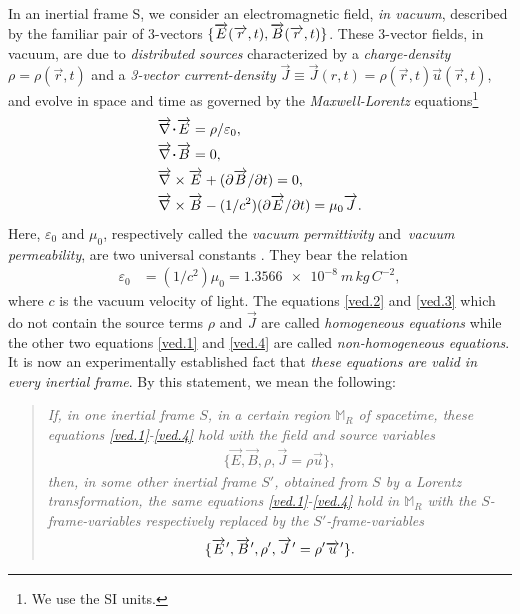 In an inertial frame S, we consider an electromagnetic  
field, \textsl{in vacuum}, described by the familiar pair 
of  3-vectors $\{\vec{E}(\vec{r}, t), 
\vec{B}\break (\vec{r}, t)\}$. These 3-vector fields,  in vacuum, 
are due to \textsl{distributed sources} characterized by a 
\textsl{charge-density} $\rho = \rho(\vec{r}, t)$ and a 
\textsl{3-vector current-density}  $\vec{J} \equiv 
\vec{J}(r, t) = \rho(\vec{r}, t)\vec{u}(\vec{r}, t) $,  and 
evolve in  space and time as governed by the 
\textsl{Maxwell-Lorentz} equations\footnote{We use the SI 
units.} 
\begin{align}\label{ved.1}
&\vnab \dotp \vec{E} = \rho/\varepsilon_0, \\
&\vnab \dotp \vec{B} = 0, \label{ved.2} \\
&\vnab \cross \vec{E}+(\dow\vec{B}/\dow t)= 
0,\label{ved.3}\\
&\vnab \cross\vec{B} - (1/c^2) (\dow\vec{E}/\dow t)
= \mu_0 \vec{J}.\label{ved.4}
\end{align}
Here, $\varepsilon_0 $ and $ \mu_0 $, respectively called 
the \textsl{vacuum permittivity} and\  \textsl{vacuum 
permeability},  are two universal constants  . They bear 
the relation
\begin{align*}
\varepsilon_0 & = (1/c^2) \mu_0 = \SI{1.3566 e-8}{m\,
kg\,C^{-2}},
\end{align*}
where $c$ is the vacuum velocity of light. The equations 
\eqref{ved.2} and \eqref{ved.3} which do not contain the 
source terms $\rho$ and $\vec{J}$ are called 
\textsl{homogeneous equations} while the other two 
equations 
\eqref{ved.1} and \eqref{ved.4} are called 
\textsl{non-homogeneous equations}. It is now an 
experimentally established fact that \textsl{these 
equations 
are valid in every inertial frame}. By this statement, we 
mean the following: \begin{quote} \textsl{If, in one 
inertial frame $S$, in a certain region $\mathbb{M}_R $ of 
spacetime, these equations \eqref{ved.1}-\eqref{ved.4} hold 
with the  field and source variables
\begin{align*}
\{\vec{E} , \vec{B}, \rho, \vec{J} = \rho\vec{u} \},
\end{align*}
then, in some other inertial frame $S'$, obtained from $S$ 
by a Lorentz transformation, the same equations 
\eqref{ved.1}-\eqref{ved.4} hold in $\mathbb{M}_R$ with 
the  $S$-frame-variables respectively replaced by  
the $S'$-frame-variables
\begin{align*}
\{{\overrightarrow{E}\hspace*{.3pt}'}, {\overrightarrow{B}\hspace*{.3pt}'}, \rho', {\overrightarrow{J}\hspace*{.3pt}'}= \rho'{\overrightarrow{u}\hspace*{.3pt}'} \}.
\end{align*}}
\end{quote}

